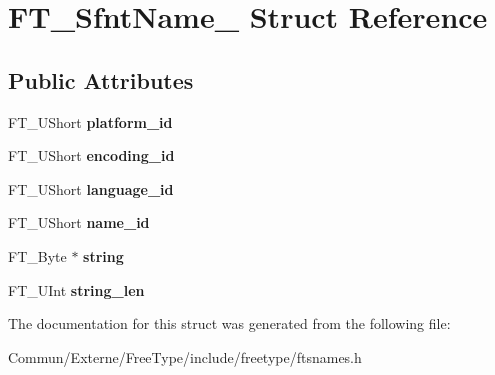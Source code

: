 \hypertarget{struct_f_t___sfnt_name__}{}\section{F\+T\+\_\+\+Sfnt\+Name\+\_\+ Struct Reference}
\label{struct_f_t___sfnt_name__}
\subsection*{Public Attributes}
\begin{DoxyCompactItemize}
\item 
F\+T\+\_\+\+U\+Short {\bfseries platform\+\_\+id}\hypertarget{struct_f_t___sfnt_name___ae92450a058eb4737df85f66226d69f43}{}\label{struct_f_t___sfnt_name___ae92450a058eb4737df85f66226d69f43}

\item 
F\+T\+\_\+\+U\+Short {\bfseries encoding\+\_\+id}\hypertarget{struct_f_t___sfnt_name___a01f4573605eab3f4d2e4b9b50b0de98f}{}\label{struct_f_t___sfnt_name___a01f4573605eab3f4d2e4b9b50b0de98f}

\item 
F\+T\+\_\+\+U\+Short {\bfseries language\+\_\+id}\hypertarget{struct_f_t___sfnt_name___a6fb23e0f299a97b25b63805b04cf1fc5}{}\label{struct_f_t___sfnt_name___a6fb23e0f299a97b25b63805b04cf1fc5}

\item 
F\+T\+\_\+\+U\+Short {\bfseries name\+\_\+id}\hypertarget{struct_f_t___sfnt_name___ac07be3e852408990fe0a910f00b68f4e}{}\label{struct_f_t___sfnt_name___ac07be3e852408990fe0a910f00b68f4e}

\item 
F\+T\+\_\+\+Byte $\ast$ {\bfseries string}\hypertarget{struct_f_t___sfnt_name___ab369e2c3d8dc9662f69c53e4d3158067}{}\label{struct_f_t___sfnt_name___ab369e2c3d8dc9662f69c53e4d3158067}

\item 
F\+T\+\_\+\+U\+Int {\bfseries string\+\_\+len}\hypertarget{struct_f_t___sfnt_name___a4ebdb7207b5681d16f9cc17f432cb56f}{}\label{struct_f_t___sfnt_name___a4ebdb7207b5681d16f9cc17f432cb56f}

\end{DoxyCompactItemize}


The documentation for this struct was generated from the following file\+:\begin{DoxyCompactItemize}
\item 
Commun/\+Externe/\+Free\+Type/include/freetype/ftsnames.\+h\end{DoxyCompactItemize}
